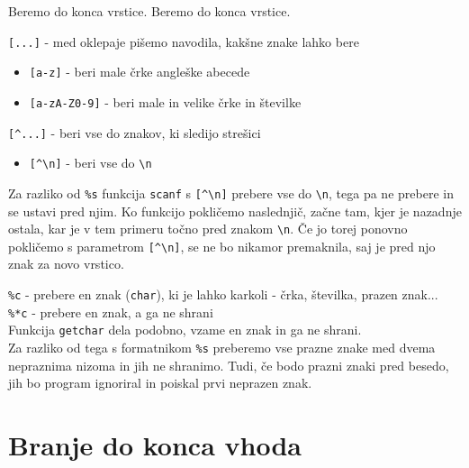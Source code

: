 \begin{examples}


\begin{inout}
Beremo do konca vrstice.
\tcblower
Beremo do konca vrstice.
\end{inout}

\end{examples}

\verb+[...]+ - med oklepaje pišemo navodila, kakšne znake lahko bere
\begin{itemize}
	\item \verb+[a-z]+ - beri male črke angleške abecede
	\item \verb+[a-zA-Z0-9]+ - beri male in velike črke in številke
\end{itemize}

\verb+[^...]+ - beri vse do znakov, ki sledijo strešici
\begin{itemize}
	\item \verb+[^\n]+ - beri vse do \verb+\n+
\end{itemize}

\begin{errors}
Za razliko od \verb+%s+ funkcija \verb+scanf+ s \verb+[^\n]+ prebere vse do \verb+\n+, tega pa ne prebere in se ustavi pred njim. Ko funkcijo pokličemo naslednjič, začne tam, kjer je nazadnje ostala, kar je v tem primeru točno pred znakom \verb+\n+. Če jo torej ponovno pokličemo s parametrom \verb+[^\n]+, se ne bo nikamor premaknila, saj je pred njo znak za novo vrstico. \\
\end{errors}

\verb+%c+ - prebere en znak (\verb+char+), ki je lahko karkoli - črka, številka, prazen znak... \\
\verb+%*c+ - prebere en znak, a ga ne shrani \\
Funkcija \verb+getchar+ dela podobno, vzame en znak in ga ne shrani. \\

Za razliko od tega s formatnikom \verb+%s+ preberemo vse prazne znake med dvema
nepraznima nizoma in jih ne shranimo. Tudi, če bodo prazni znaki pred besedo,
jih bo program ignoriral in poiskal prvi neprazen znak.

\pagebreak
\section{Branje do konca vhoda}

